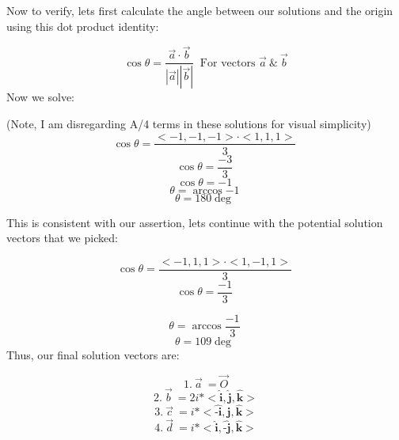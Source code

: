 \documentclass[12pt,letterpaper, onecolumn]{exam}
\begin{document}
\begin{questions}
\begin{solution}
        Now to verify, lets first calculate the angle between our solutions and the origin using this dot product identity:

        \begin{equation}
            \cos{\theta}=\frac{\vec{a}\cdot\vec{b}}{|\vec{a}||\vec{b}|}\ \text{   For vectors }\vec{a}\ \&\ \vec{b}
        \end{equation}
        Now we solve:

         (Note, I am disregarding A/4 terms in these solutions for visual simplicity)
        \begin{equation}
            \cos{\theta}=\frac{<-1,-1,-1>\cdot<1,1,1>}{3}\ 
        \end{equation}
        \begin{equation}
            \cos{\theta}=\frac{-3}{3}\ 
        \end{equation}
        \begin{equation}
            \cos{\theta}=-1\ 
        \end{equation}
        \begin{equation}
            \theta=\arccos{-1}\ 
        \end{equation}
        \begin{equation}
            \theta=180\deg\ 
        \end{equation}

    This is consistent with our assertion, lets continue with the potential solution vectors that we picked:

    \begin{equation}
            \cos{\theta}=\frac{<-1,1,1>\cdot<1,-1,1>}{3}\ 
        \end{equation}
        \begin{equation}
            \cos{\theta}=\frac{-1}{3}\ 
        \end{equation}
       
        \begin{equation}
            \theta=\arccos{\frac{-1}{3}}\ 
        \end{equation}
        \begin{equation}
            \theta=109\deg\ 
        \end{equation}
\newpage
    Thus, our final solution vectors are:

    \begin{equation}
            1.\ \vec{a}\ =\vec{O}
        \end{equation}
        \begin{equation}
            2.\ \vec{b}\ =2i*<\hat{\textbf{i}},\hat{\textbf{j}},\hat{\textbf{k}}>
        \end{equation}
        \begin{equation}
            3.\ \vec{c}\ =i*<\hat{\textbf{-i}},\hat{\textbf{j}},\hat{\textbf{k}}>
        \end{equation}
        \begin{equation}
            4.\ \vec{d}\ =i*<\hat{\textbf{i}},\hat{\textbf{-j}},\hat{\textbf{k}}>
        \end{equation}
    \end{solution}


\end{questions}
\end{document}
